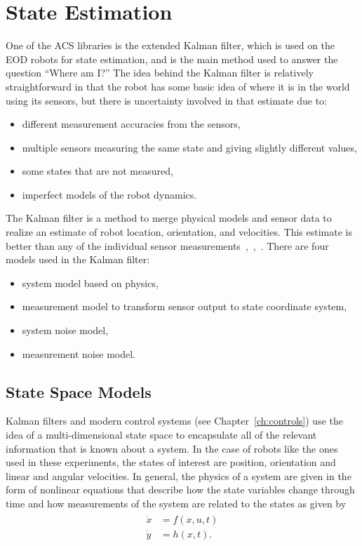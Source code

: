 \chapter{State Estimation}%
\label{ch:estimation}
One of the ACS libraries is the extended Kalman filter, which is used on the EOD robots for state estimation, and is the main method used to answer the question ``Where am I?'' The idea behind the Kalman filter is relatively straightforward in that the robot has some basic idea of where it is in the world using its sensors, but there is uncertainty involved in that estimate due to:
\begin{itemize}
\item different measurement accuracies from the sensors,
\item multiple sensors measuring the same state and giving slightly different values,
\item some states that are not measured,
\item imperfect models of the robot dynamics.
\end{itemize}

The Kalman filter is a method to merge physical models and sensor data to realize an estimate of robot location, orientation, and velocities.
This estimate is better than any of the individual sensor measurements~\cite{Simon06OptimalEstimation},~\cite{Grewal08},~\cite{Orderud05}.
There are four models used in the Kalman filter:
\begin{itemize}
\item system model based on physics,
\item measurement model to transform sensor output to state coordinate system,
\item system noise model,
\item measurement noise model.
\end{itemize}

\section{State Space Models}%
\label{sec:statespacemodels}
Kalman filters and modern control systems (see Chapter~\ref{ch:controls}) use the idea of a multi-dimensional state space to encapsulate all of the relevant information that is known about a system.
In the case of robots like the ones used in these experiments, the states of interest are position, orientation and linear and angular velocities.
In general, the physics of a system are given in the form of nonlinear equations that describe how the state variables change through time and how measurements of the system are related to the states as given by
\begin{align}
\label{eq:statespace}
\begin{split}
\dot{x} &= f(x,u,t) \\
\dot{y} &= h(x,t).
\end{split}
\end{align}

